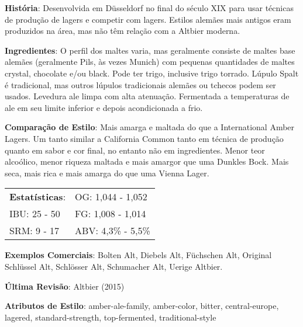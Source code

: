\textbf{História}: Desenvolvida em Düsseldorf no final do século XIX para usar técnicas de produção de lagers e competir com lagers. Estilos alemães mais antigos eram produzidos na área, mas não têm relação com a Altbier moderna.

\textbf{Ingredientes}: O perfil dos maltes varia, mas geralmente consiste de maltes base alemães (geralmente Pils, às vezes Munich) com pequenas quantidades de maltes crystal, chocolate e/ou black. Pode ter trigo, inclusive trigo torrado. Lúpulo Spalt é tradicional, mas outros lúpulos tradicionais alemães ou tchecos podem ser usados. Levedura ale limpa com alta atenuação. Fermentada a temperaturas de ale em seu limite inferior e depois acondicionada a frio.

\textbf{Comparação de Estilo}: Mais amarga e maltada do que a International Amber Lagers. Um tanto similar a California Common tanto em técnica de produção quanto em sabor e cor final, no entanto não em ingredientes. Menor teor alcoólico, menor riqueza maltada e mais amargor que uma Dunkles Bock. Mais seca, mais rica e mais amarga do que uma Vienna Lager.

\begin{tabular}{@{}p{35mm}p{35mm}@{}}
  \textbf{Estatísticas}: & OG: 1,044 - 1,052 \\
  IBU: 25 - 50 & FG: 1,008 - 1,014 \\
  SRM: 9 - 17 & ABV: 4,3\% - 5,5\%
\end{tabular}

\textbf{Exemplos Comerciais}: Bolten Alt, Diebels Alt, Füchschen Alt, Original Schlüssel Alt, Schlösser Alt, Schumacher Alt, Uerige Altbier.

\textbf{Última Revisão}: Altbier (2015)

\textbf{Atributos de Estilo}: amber-ale-family, amber-color, bitter, central-europe, lagered, standard-strength, top-fermented, traditional-style

